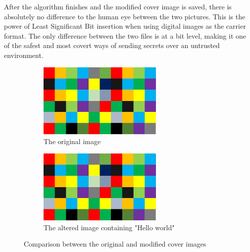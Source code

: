 After the algorithm finishes and the modified cover image is saved, there is absolutely no difference to the human eye between the two pictures. This is the power of Least Significant Bit insertion when using digital images as the carrier format. The only difference between the two files is at a bit level, making it one of the safest and most covert ways of sending secrets over an untrusted environment.

\begin{figure}[H]
\centering
\begin{subfigure}{.5\textwidth}
    \centering
    \includegraphics[width=6cm,keepaspectratio]{pics/bmp_scrambling/original_image}
    \caption{The original image}
\end{subfigure}%
\begin{subfigure}{.5\textwidth}
    \centering
    \includegraphics[width=6cm,keepaspectratio]{pics/bmp_scrambling/altered_image}
    \caption{The altered image containing "Hello world"}
\end{subfigure}
\caption{Comparison between the original and modified cover images}
\end{figure}

